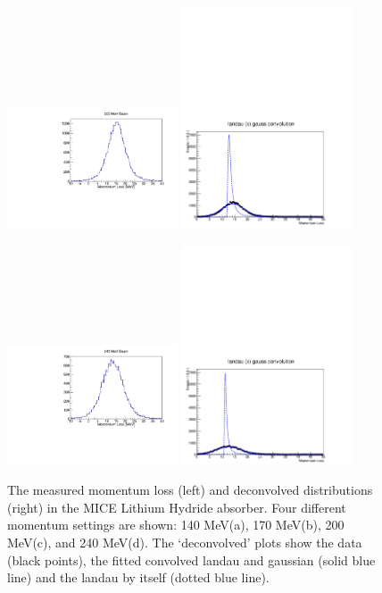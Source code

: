 \begin{figure}
\includegraphics[width=0.45\textwidth]{11-Absorber/Figures/raw_200.pdf}\hfil
\includegraphics[width=0.45\textwidth]{11-Absorber/Figures/deconv_200.pdf}
\vspace{-5cm}

\includegraphics[width=0.45\textwidth]{11-Absorber/Figures/raw_240.pdf}\hfil
\includegraphics[width=0.45\textwidth]{11-Absorber/Figures/deconv_240.pdf}
\caption{\label{fig:eloss_data} The measured momentum loss (left) and deconvolved distributions (right) in the MICE Lithium Hydride absorber.  Four different momentum settings are shown: 140 MeV(a), 170 MeV(b), 200 MeV(c), and 240 MeV(d).  The `deconvolved' plots show the data (black points), the fitted convolved landau and gaussian (solid blue line) and the landau by itself (dotted blue line).}
\end{figure}

